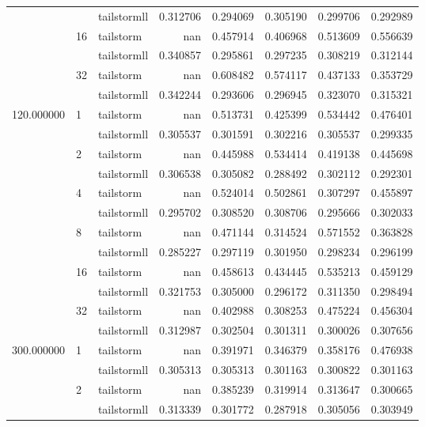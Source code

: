 \begin{tabular}{lllrrrrr}
 &  & tailstormll & 0.312706 & 0.294069 & 0.305190 & 0.299706 & 0.292989 \\
 & \multirow[c]{2}{*}{16} & tailstorm & nan & 0.457914 & 0.406968 & 0.513609 & 0.556639 \\
 &  & tailstormll & 0.340857 & 0.295861 & 0.297235 & 0.308219 & 0.312144 \\
 & \multirow[c]{2}{*}{32} & tailstorm & nan & 0.608482 & 0.574117 & 0.437133 & 0.353729 \\
 &  & tailstormll & 0.342244 & 0.293606 & 0.296945 & 0.323070 & 0.315321 \\
\multirow[c]{12}{*}{120.000000} & \multirow[c]{2}{*}{1} & tailstorm & nan & 0.513731 & 0.425399 & 0.534442 & 0.476401 \\
 &  & tailstormll & 0.305537 & 0.301591 & 0.302216 & 0.305537 & 0.299335 \\
 & \multirow[c]{2}{*}{2} & tailstorm & nan & 0.445988 & 0.534414 & 0.419138 & 0.445698 \\
 &  & tailstormll & 0.306538 & 0.305082 & 0.288492 & 0.302112 & 0.292301 \\
 & \multirow[c]{2}{*}{4} & tailstorm & nan & 0.524014 & 0.502861 & 0.307297 & 0.455897 \\
 &  & tailstormll & 0.295702 & 0.308520 & 0.308706 & 0.295666 & 0.302033 \\
 & \multirow[c]{2}{*}{8} & tailstorm & nan & 0.471144 & 0.314524 & 0.571552 & 0.363828 \\
 &  & tailstormll & 0.285227 & 0.297119 & 0.301950 & 0.298234 & 0.296199 \\
 & \multirow[c]{2}{*}{16} & tailstorm & nan & 0.458613 & 0.434445 & 0.535213 & 0.459129 \\
 &  & tailstormll & 0.321753 & 0.305000 & 0.296172 & 0.311350 & 0.298494 \\
 & \multirow[c]{2}{*}{32} & tailstorm & nan & 0.402988 & 0.308253 & 0.475224 & 0.456304 \\
 &  & tailstormll & 0.312987 & 0.302504 & 0.301311 & 0.300026 & 0.307656 \\
\multirow[c]{12}{*}{300.000000} & \multirow[c]{2}{*}{1} & tailstorm & nan & 0.391971 & 0.346379 & 0.358176 & 0.476938 \\
 &  & tailstormll & 0.305313 & 0.305313 & 0.301163 & 0.300822 & 0.301163 \\
 & \multirow[c]{2}{*}{2} & tailstorm & nan & 0.385239 & 0.319914 & 0.313647 & 0.300665 \\
 &  & tailstormll & 0.313339 & 0.301772 & 0.287918 & 0.305056 & 0.303949 \\

\end{tabular}
